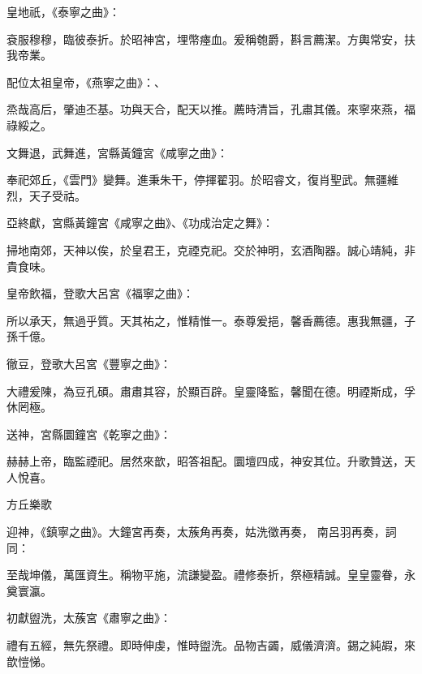 \begin{pinyinscope}
 皇地祇，《泰寧之曲》：



 袞服穆穆，臨彼泰折。於昭神宮，埋幣瘞血。爰稱匏爵，斟言薦潔。方輿常安，扶我帝業。



 配位太祖皇帝，《燕寧之曲》：、



 烝哉高后，肇迪丕基。功與天合，配天以推。薦時清旨，孔肅其儀。來寧來燕，福祿綏之。



 文舞退，武舞進，宮縣黃鐘宮《咸寧之曲》：



 奉祀郊丘，《雲門》變舞。進秉朱干，停揮翟羽。於昭睿文，復肖聖武。無疆維烈，天子受祜。



 亞終獻，宮縣黃鐘宮《咸寧之曲》、《功成治定之舞》：



 掃地南郊，天神以俟，於皇君王，克禋克祀。交於神明，玄酒陶器。誠心靖純，非貴食味。



 皇帝飲福，登歌大呂宮《福寧之曲》：



 所以承天，無過乎質。天其祐之，惟精惟一。泰尊爰挹，馨香薦德。惠我無疆，子孫千億。



 徹豆，登歌大呂宮《豐寧之曲》：



 大禮爰陳，為豆孔碩。肅肅其容，於顯百辟。皇靈降監，馨聞在德。明禋斯成，孚休罔極。



 送神，宮縣圜鐘宮《乾寧之曲》：



 赫赫上帝，臨監禋祀。居然來歆，昭答祖配。圜壇四成，神安其位。升歌贊送，天人悅喜。



 方丘樂歌



 迎神，《鎮寧之曲》。大鐘宮再奏，太蔟角再奏，姑洗徵再奏，
 南呂羽再奏，詞同：



 至哉坤儀，萬匯資生。稱物平施，流謙變盈。禮修泰折，祭極精誠。皇皇靈眷，永奠寰瀛。



 初獻盥洗，太蔟宮《肅寧之曲》：



 禮有五經，無先祭禮。即時伸虔，惟時盥洗。品物吉蠲，威儀濟濟。錫之純嘏，來歆愷悌。




\end{pinyinscope}
